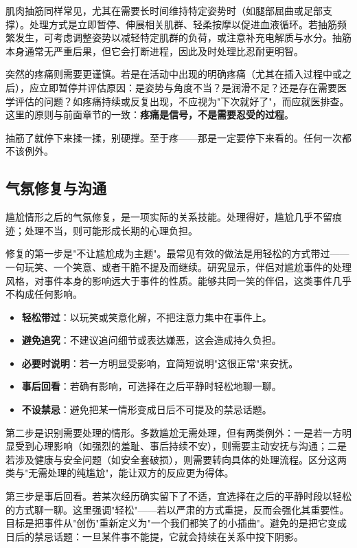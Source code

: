 \documentclass[12pt,UTF8]{ctexbook}
\newcommand{\keyword}[1]{\textbf{#1}}
\begin{document}
肌肉抽筋同样常见，尤其在需要长时间维持特定姿势时（如腿部屈曲或足部支撑）。处理方式是立即暂停、伸展相关肌群、轻柔按摩以促进血液循环。若抽筋频繁发生，可考虑调整姿势以减轻特定肌群的负荷，或注意补充电解质与水分。抽筋本身通常无严重后果，但它会打断进程，因此及时处理比忍耐更明智。

突然的疼痛则需要更谨慎。若是在活动中出现的明确疼痛（尤其在插入过程中或之后），应立即暂停并评估原因：是姿势与角度不当？是润滑不足？还是存在需要医学评估的问题？如疼痛持续或反复出现，不应视为"下次就好了"，而应就医排查。这里的原则与前面章节的一致：\keyword{疼痛是信号，不是需要忍受的过程}。

\begin{tcolorbox}[colback=pink!5!white,colframe=red!50!black,title=贴心小叮咛]
抽筋了就停下来揉一揉，别硬撑。至于疼——那是一定要停下来看的。任何一次都不该例外。
\end{tcolorbox}
\subsection{气氛修复与沟通}

尴尬情形之后的气氛修复，是一项实际的关系技能。处理得好，尴尬几乎不留痕迹；处理不当，则可能形成长期的心理负担。

修复的第一步是"不让尴尬成为主题"。最常见有效的做法是用轻松的方式带过——一句玩笑、一个笑意、或者干脆不提及而继续。研究显示，伴侣对尴尬事件的处理风格，对事件本身的影响远大于事件的性质。能够共同一笑的伴侣，这类事件几乎不构成任何影响。

\begin{itemize}
  \item \keyword{轻松带过}：以玩笑或笑意化解，不把注意力集中在事件上。
  \item \keyword{避免追究}：不建议追问细节或表达嫌恶，这会造成持久负担。
  \item \keyword{必要时说明}：若一方明显受影响，宜简短说明"这很正常"来安抚。
  \item \keyword{事后回看}：若确有影响，可选择在之后平静时轻松地聊一聊。
  \item \keyword{不设禁忌}：避免把某一情形变成日后不可提及的禁忌话题。
\end{itemize}

第二步是识别需要处理的情形。多数尴尬无需处理，但有两类例外：一是若一方明显受到心理影响（如强烈的羞耻、事后持续不安），则需要主动安抚与沟通；二是若涉及健康与安全问题（如安全套破损），则需要转向具体的处理流程。区分这两类与"无需处理的纯尴尬"，能让双方的反应更为得体。

第三步是事后回看。若某次经历确实留下了不适，宜选择在之后的平静时段以轻松的方式聊一聊。这里强调"轻松"——若以严肃的方式重提，反而会强化其重要性。目标是把事件从"创伤"重新定义为"一个我们都笑了的小插曲"。避免的是把它变成日后的禁忌话题：一旦某件事不能提，它就会持续在关系中投下阴影。
\end{document}
